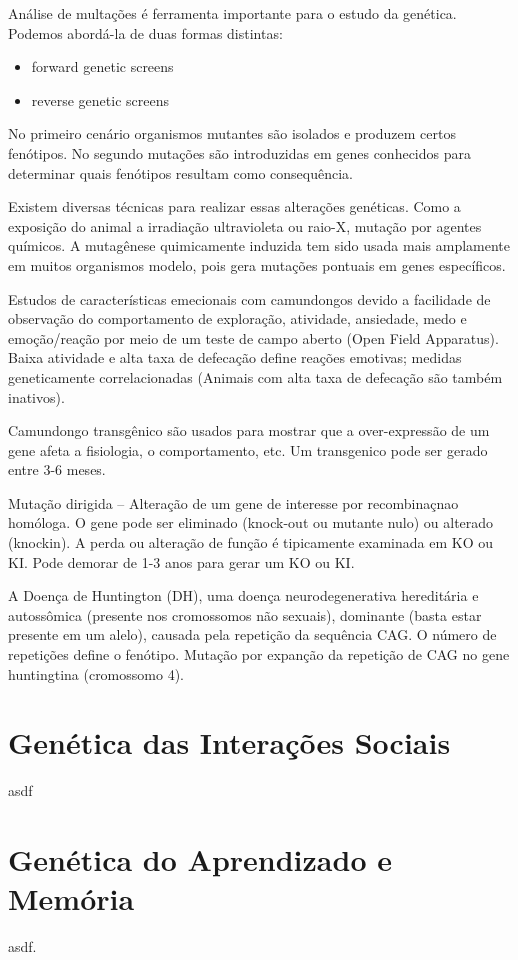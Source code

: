 \documentclass[
	article,			%
	12pt,				%
	oneside,			%
	a4paper,			%
	english,			%
	brazil,				%
	sumario=tradicional
	]{abntex2}
\begin{document}
Análise de multações é ferramenta importante para o estudo da genética. Podemos abordá-la de duas formas distintas:
\begin{itemize}
    \item forward genetic screens
    \item reverse genetic screens
\end{itemize}
No primeiro cenário organismos mutantes são isolados e produzem certos fenótipos.
No segundo mutações são introduzidas em genes conhecidos para determinar quais fenótipos resultam como consequência.

Existem diversas técnicas para realizar essas alterações genéticas. Como a exposição do animal a irradiação ultravioleta ou raio-X, mutação por agentes químicos.
A mutagênese quimicamente induzida tem sido usada mais amplamente em muitos organismos modelo, pois gera mutações pontuais em genes específicos.

Estudos de características emecionais com camundongos devido a facilidade de observação do comportamento de exploração,	atividade,	ansiedade,	medo	e emoção/reação	por meio de	um teste de	campo	aberto	(Open	Field	
Apparatus). Baixa	atividade	e	alta taxa	de	defecação	define	 reações	emotivas;	 medidas	geneticamente correlacionadas	(Animais	com	alta taxa	de	defecação	são	também	inativos).	

Camundongo	transgênico	são usados	para	mostrar	que	a	over-expressão	de	um	gene	afeta	a	fisiologia,	o	
comportamento,	etc. Um	transgenico	pode ser	 gerado	entre	3-6	meses.

Mutação	dirigida	–	Alteração	de	um	gene	de	interesse	por recombinaçnao	homóloga. O	gene	pode	ser	eliminado (knock-out	ou	mutante	nulo)	ou	alterado (knockin).		A	perda	ou	alteração	de	função	é	tipicamente	examinada	em	KO	ou KI. Pode	demorar	de	1-3	anos	
para	gerar	um	KO	ou	KI.

A Doença de Huntington (DH), uma doença neurodegenerativa hereditária e autossômica (presente nos cromossomos não sexuais), dominante (basta estar presente em um alelo), causada pela repetição da sequência CAG. O número de repetições define o fenótipo.
Mutação por expanção da repetição de CAG no gene huntingtina (cromossomo 4).

\section{Genética das Interações Sociais}
\label{geneticadasinteracoes}
asdf

\section{Genética do Aprendizado e Memória}
\label{geneticadoaprendizado}
asdf.
\end{document}
